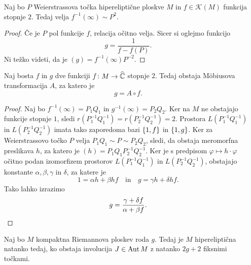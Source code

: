 \begin{lema}
Naj bo $P$ Weierstrassova točka hipereliptične ploskve $M$ in
$f \in \mathscr{K}(M)$ funkcija stopnje $2$. Tedaj velja
$f^{-1}(\infty) \sim P^2$.
\end{lema}

\begin{proof}
Če je $P$ pol funkcije $f$, relacija očitno velja. Sicer si oglejmo
funkcijo
\[
g = \frac{1}{f - f(P)}.
\]
Ni težko videti, da je $(g) = f^{-1}(\infty) P^{-2}$.
\end{proof}

\begin{trditev}
Naj bosta $f$ in $g$ dve funkciji $f \colon M \to \widehat{\mathbb{C}}$ stopnje
$2$. Tedaj obstaja Möbiusova transformacija $A$, za katero je
\[
g = A \circ f.
\]
\end{trditev}

\begin{proof}
Naj bo $f^{-1}(\infty) = P_1 Q_1$ in $g^{-1}(\infty) = P_2 Q_2$.
Ker na $M$ ne obstajajo funkcije stopnje $1$, sledi
$r(P_1^{-1} Q_1^{-1}) = r(P_2^{-1} Q_2^{-1}) = 2$. Prostora
$L(P_1^{-1} Q_1^{-1})$ in $L(P_2^{-1} Q_2^{-1})$ imata tako
zaporedoma bazi $\left\{1, f\right\}$ in $\left\{1, g\right\}$. Ker za Weierstrassovo
točko $P$ velja $P_1 Q_1 \sim P \sim P_2 Q_2$, sledi, da obstaja
meromorfna preslikava $h$, za katero je
$(h) = P_1 Q_1 P_2^{-1} Q_2^{-1}$. Ker je s predpisom
$\varphi \mapsto h \cdot \varphi$ očitno podan izomorfizem
prostorov $L(P_1^{-1} Q_1^{-1})$ in $L(P_2^{-1} Q_2^{-1})$,
obstajajo konstante $\alpha, \beta, \gamma$ in $\delta$, za katere
je
\[
1 = \alpha h + \beta hf
\quad \text{in} \quad
g = \gamma h + \delta hf.
\]
Tako lahko izrazimo
\[
g = \frac{\gamma + \delta f}{\alpha + \beta f}. \qedhere
\]
\end{proof}

\begin{trditev}
Naj bo $M$ kompaktna Riemannova ploskev roda $g$. Tedaj je $M$
hipereliptična natanko tedaj, ko obstaja involucija $J \in \operatorname{Aut} M$
z natanko $2g + 2$ fiksnimi točkami.
\end{trditev}

